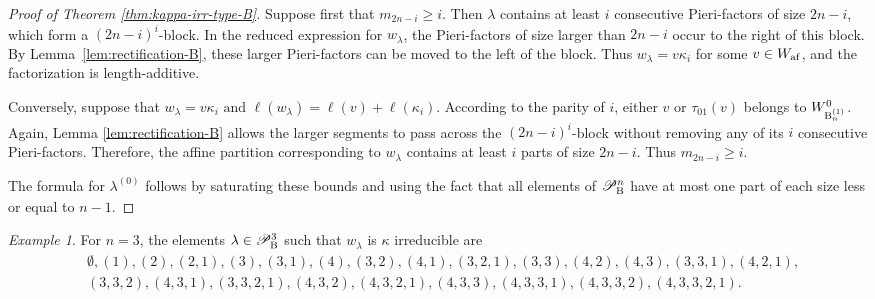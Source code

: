\documentclass[a4paper]{amsart}
\theoremstyle{remark}
\newtheorem{example}[thm]{Example}
\numberwithin{equation}{section}
\begin{document}
\begin{proof}[Proof of Theorem \ref{thm:kappa-irr-type-B}] 
Suppose first that \(m_{2n-i}\geq i\). Then \(\lambda\) contains at least \(i\) consecutive Pieri-factors of size \(2n-i\), which form a \((2n-i)^i\)-block. In the reduced expression for \(w_\lambda\), the Pieri-factors of size larger than $2n-i$ occur to the right of this block. By Lemma~\ref{lem:rectification-B}, these larger Pieri-factors can be moved to the left of the block. Thus $w_\lambda=v\kappa_i$ for some \(v\in W_{\mathrm{af}}\), and the factorization is length-additive.

Conversely, suppose that $ w_\lambda=v\kappa_i \text{ and } \ell(w_\lambda)=\ell(v)+\ell(\kappa_i).$  According to the parity of \(i\), either \(v\) or \(\tau_{01}(v)\) belongs to \(W_{\mathrm{B}_{n}^{(1)}}^0\). Again, Lemma \ref{lem:rectification-B} allows the larger segments to pass across the \((2n-i)^i\)-block without removing any of its \(i\) consecutive Pieri-factors. Therefore, the affine partition corresponding to \(w_\lambda\) contains at least \(i\) parts of size \(2n-i\). Thus $ m_{2n-i}\geq i.$ 

The formula for \(\lambda^{(0)}\) follows by saturating these bounds and using the fact that all elements of $\mathscr{P}^n_{\mathrm{B}_{}}$ have at most one part of each size less or equal to $n-1$.
\end{proof}













\begin{example}
For $n=3$, the elements $\lambda\in \mathscr{P}^3_{\mathrm{B}_{}}$ such that $w_\lambda$ is $\kappa$ irreducible are 
\begin{align*}
&\emptyset, (1), (2), (2,1), (3), (3,1), (4), (3,2), (4,1), (3,2,1),(3,3), (4,2), (4,3), (3,3,1), (4,2,1),\\ & (3,3,2),(4,3,1),  (3,3,2,1), (4,3,2), (4,3,2,1), (4,3,3), (4,3,3,1), (4,3,3,2), (4,3,3,2,1).\end{align*}
\end{example}
\end{document}
